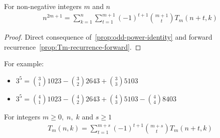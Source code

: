 \begin{proposition}
    \label{prop:odd-power-decomposition-forward}
    For non-negative integers $m$ and $n$
    \begin{align*}
        n^{2m+1} = \sum_{k=1}^{n} \sum_{t=1}^{m+1} (-1)^{t+1} \binom{m+1}{t} T_{m} (n+t, k)
    \end{align*}
    \begin{proof}
        Direct consequence of~\eqref{prop:odd-power-identity}
        and forward recurrence~\eqref{prop:Tm-recurrence-forward}.
    \end{proof}
\end{proposition}
For example:
\begin{itemize}
    \item $3^5 = \binom{3}{1} 1023 - \binom{3}{2} 2643 + \binom{3}{3} 5103$
    \item $3^5 = \binom{4}{1} 1023 - \binom{4}{2} 2643+ \binom{4}{3} 5103 - \binom{4}{4} 8403$
\end{itemize}
\begin{proposition}
    For integers $m \geq 0, \; n, \; k$ and $s \geq 1$
    \label{prop:Tm-recurrence-forward-multifold}
    \begin{align*}
        T_{m} (n,k) = \sum_{t=1}^{m+s} (-1)^{t+1} \binom{m+s}{t} T_{m} (n+t, k)
    \end{align*}
\end{proposition}

